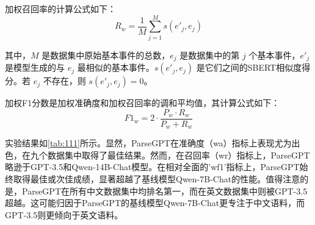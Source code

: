 加权召回率的计算公式如下：
\[ R_w = \frac{1}{M} \sum_{j=1}^{M} s(e'_j, e_j) \]

其中，\( M \) 是数据集中原始基本事件的总数，\( e_j \) 是数据集中的第 \( j \) 个基本事件，\( e'_j \) 是模型生成的与 \( e_j \) 最相似的基本事件。\( s(e'_j, e_j) \) 是它们之间的SBERT相似度得分。若 \( e_j \) 不存在，则 \( s(e'_j, e_j) = 0 \)。

加权F1分数是加权准确度和加权召回率的调和平均值，其计算公式如下：
\[ F1_w = 2 \cdot \frac{P_w \cdot R_w}{P_w + R_w} \]

实验结果如\autoref{tab:111}所示。显然，ParseGPT在准确度（wa）指标上表现尤为出色，在九个数据集中取得了最佳结果。然而，在召回率（wr）指标上，ParseGPT略逊于GPT-3.5和Qwen-14B-Chat模型。在相对全面的'wf1'指标上，ParseGPT始终取得最佳或次佳成绩，显著超越了基线模型Qwen-7B-Chat的性能。值得注意的是，ParseGPT在所有中文数据集中均排名第一，而在英文数据集中则被GPT-3.5超越。这可能归因于ParseGPT的基线模型Qwen-7B-Chat更专注于中文语料，而GPT-3.5则更倾向于英文语料。

